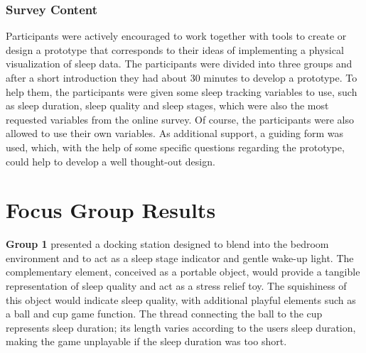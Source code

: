 \documentclass[
  a4paper,  %
  twoside,  %
  bibliography=totoc,
  headsepline,
  cleardoublepage=empty,
  parskip=half,
  draft=false
]{scrbook}
\begin{document}
\subsubsection{Survey Content}
Participants were actively encouraged to work together with tools to create or design a prototype that corresponds to their ideas of implementing a physical visualization of sleep data. The participants were divided into three groups and after a short introduction they had about 30 minutes to develop a prototype. To help them, the participants were given some sleep tracking variables to use, such as sleep duration, sleep quality and sleep stages, which were also the most requested variables from the online survey. Of course, the participants were also allowed to use their own variables. As additional support, a guiding form was used, which, with the help of some specific questions regarding the prototype, could help to develop a well thought-out design.
\section{Focus Group Results}

\textbf{Group 1} presented a docking station designed to blend into the bedroom environment and to act as a sleep stage indicator and gentle wake-up light. The complementary element, conceived as a portable object, would provide a tangible representation of sleep quality and act as a stress relief toy. The squishiness of this object would indicate sleep quality, with additional playful elements such as a ball and cup game function. The thread connecting the ball to the cup represents sleep duration; its length varies according to the users sleep duration, making the game unplayable if the sleep duration was too short.
\end{document}
